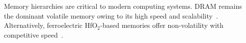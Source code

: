 Memory hierarchies are critical to modern computing systems. 
DRAM remains the dominant volatile memory owing to its high speed and scalability~\cite{choi2022, iedm2023_dram}. 
Alternatively, ferroelectric HfO$_2$-based memories offer non-volatility with competitive speed~\cite{boscke2011, noheda2023}. 
